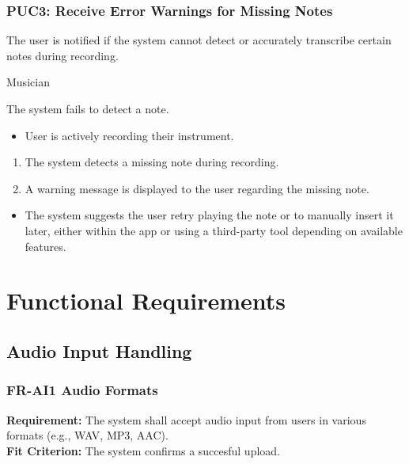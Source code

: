 \documentclass[12pt]{article}
\begin{document}
\subsubsection*{PUC3: Receive Error Warnings for Missing Notes}
\begin{description}[style=nextline]
    \item[Description:] The user is notified if the system cannot detect or accurately transcribe certain notes during recording.
    \item[Primary Actor:] Musician
    \item[Trigger:] The system fails to detect a note.
    \item[Preconditions:]
    \begin{itemize}
        \item User is actively recording their instrument.
    \end{itemize}
    \item[Main Success Scenario:]
    \begin{enumerate}
        \item The system detects a missing note during recording.
        \item A warning message is displayed to the user regarding the missing note.
    \end{enumerate}
    \item[Exceptions:]
    \begin{itemize}
        \item The system suggests the user retry playing the note or to manually insert it later, either within the app or using a third-party tool depending on available features.
    \end{itemize}
\end{description}


\section{Functional Requirements} \label{FRs}
\subsection{Audio Input Handling}
\subsubsection*{FR-AI1 Audio Formats} \label{FR-AI1}
\textbf{Requirement:} The system shall accept audio input from users in various formats (e.g., WAV, MP3, AAC). \\
\textbf{Fit Criterion:} The system confirms a succesful upload.
\end{document}
